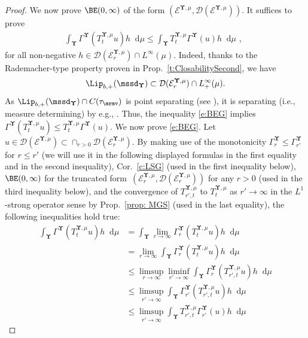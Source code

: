 \documentclass[11pt,letterpaper]{amsart}
\newcommand{\dom}[1]{\mathcal D(#1)}
\newcommand{\diff}{\mathop{}\!\mathrm{d}}
\newcommand{\comma}{\,\,\mathrm{,}\;\,}
\newcommand{\cdc}{\Gamma}
\newcommand{\QP}{{\mu}}
\newcommand{\dUpsilon}{{\mathbf \Upsilon}}
\newcommand{\U}{\dUpsilon}
\newcommand{\E}{\mathcal E}
\renewcommand{\1}{\mathbf 1}
\numberwithin{equation}{section}
\theoremstyle{plain}
\theoremstyle{definition}
\theoremstyle{remark}
\begin{document}
\begin{proof}
We now prove $\BE(0,\infty)$ of the form $(\E^{\U, \QP}, \dom{\E^{\U, \QP}})$. It suffices to prove 
\begin{align} \label{e:BEG}
\int_{\U}\cdc^{\U}(T^{\U, \QP}_tu) h \diff \QP \le \int_{\U}  T^{\U, \QP}_t\cdc^{\U}(u) h \diff \QP  \comma
\end{align}
for all non-negative $h \in \mathcal D(\E^{\U, \QP}_r) \cap L^\infty(\QP)$. Indeed, thanks to the Rademacher-type property proven in Prop.~\ref{t:ClosabilitySecond},
we have 
$$\Lip_{b, +}(\mssd_\U)\subset  \mathcal D(\E^{\U, \QP}_r) \cap L^\infty_+(\QP).$$
As $\Lip_{b,+}(\mssd_\U)\cap C(\tau_{\mrmv})$ is point separating (see \cite[(a) in Rem.~5.13]{LzDSSuz21}), it is separating (i.e., measure determining) by e.g., \cite[p.113, (a) in Thm.~4.5 in Chap.~3]{EthKur86}. Thus, the inequality \eqref{e:BEG} implies $\cdc^{\U}(T^{\U, \QP}_tu) \le T^{\U, \QP}_t\cdc^{\U}(u)$. 
We now prove \eqref{e:BEG}. Let $u \in \dom{\E^{\U, \QP}} \subset \cap_{r>0} \dom{\E^{\U, \QP}_r}$. By making use of the monotonicity $\cdc^{\U}_{r} \le \cdc^{\U}_{r'}$ for $r \le r'$ (we will use it in the following displayed formulas in the first equality and in the second inequality), Cor.~\ref{c:LSG} (used in the first inequality below),  $\BE(0,\infty)$ for the truncated form~$(\E^{\U, \QP}_{r}, \mathcal D(\E^{\U, \QP}_r))$ for any $r>0$ (used in the third inequality below), and the convergence of $T_{r', t}^{\U, \QP}$ to $T^{\U, \QP}_t$ as $r' \to \infty$ in the $L^1$-strong operator sense by Prop.~\ref{prop: MGS} (used in the last equality),  the following inequalities hold true: %
\begin{align*}
\int_{\U}\cdc^{\U}(T^{\U, \QP}_tu) h \diff \QP
&= \int_{\U} \lim_{r \to \infty} \cdc^{\U}_r(T^{\U, \QP}_tu) h \diff \QP 
\\
&=  \lim_{r \to \infty} \int_{\U} \cdc^{\U}_r(T^{\U, \QP}_tu) h \diff \QP 
\\
& \le   \limsup_{r \to \infty} \liminf_{r' \to \infty} \int_{\U} \cdc^{\U}_{r}(T_{r', t}^{\U, \QP}u)   h \diff \QP 
\\
& \le  \limsup_{r' \to \infty} \int_{\U} \cdc^{\U}_{r'}(T_{r', t}^{\U, \QP}u)   h \diff \QP 
\\
& \le  \limsup_{r' \to \infty} \int_{\U} T_{r', t}^{\U, \QP} \cdc^{\U}_{r'}(u)   h \diff \QP 

\end{align*}
\end{proof}
\end{document}

